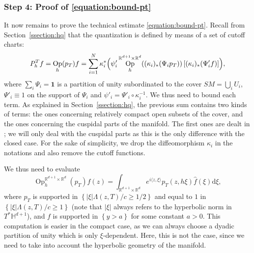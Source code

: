 \documentclass[10pt]{amsart}
\newcommand{\R}{\mathbb{R}}
\newcommand{\HH}{\mathbb{H}}
\newcommand{\dd}{\mathrm{d}}
\DeclareMathOperator{\Op}{Op}
\theoremstyle{plain}
\theoremstyle{definition}
\begin{document}
\subsubsection*{Step 4: Proof of \eqref{equation:bound-pt}}
It now remains to prove the technical estimate \eqref{equation:bound-pt}. Recall from Section~\ref{ssection:hq} that the quantization is defined by means of a set of cutoff charts:
\[
P_h^T f = \Op_h(p_T)f = \sum_{i=1}^N \kappa_i^*\Bigl( \psi'_i \Op^{\R^{d+1} \times \R^d}_h( (\kappa_i)_*(\Psi_i p_T))\left[(\kappa_i)_*(\Psi'_i f) \right] \Bigr),
\]
where $\sum_i \Psi_i = \mathbf{1}$ is a partition of unity subordinated to the cover $SM=\bigcup_i U_i$, $\Psi'_i \equiv 1$ on the support of $\Psi_i$ and $\psi'_i = \Psi'_i \circ \kappa_i^{-1}$. We thus need to bound each term. As explained in Section~\ref{ssection:hq}, the previous sum contains two kinds of terms: the ones concerning relatively compact open subsets of the cover, and the ones concerning the cuspidal parts of the manifold. The first ones are dealt in \cite[Lem.\,3.3]{Bonthonneau-Lefeuvre-21}; we will only deal with the cuspidal parts as this is the only difference with the closed case. For the sake of simplicity, we drop the diffeomorphism $\kappa_i$ in the notations and also remove the cutoff functions.

We thus need to evaluate
\[
\Op^{\R^{d+1} \times \R^d}_h( p_T )f (z) = \int_{\R^{d+1} \times \R^d} e^{i \langle z, \xi \rangle} p_T(z,h\xi) \hat{f}(\xi) \dd \xi,
\]
where $p_T$ is supported in $\left\{|\xi| \Lambda(z,T)/c \geq 1/2 \right\}$ and equal to $1$ in $\left\{ |\xi| \Lambda(z,T)/c \geq 1 \right\}$ (note that $|\xi|$ always refers to the hyperbolic norm in $T^*\HH^{d+1}$), and $f$ is supported in $\left\{y > a \right\}$ for some constant $a > 0$. This computation is easier in the compact case, as we can always choose a dyadic partition of unity which is only $\xi$-dependent. Here, this is not the case, since we need to take into account the hyperbolic geometry of the manifold.
\end{document}
